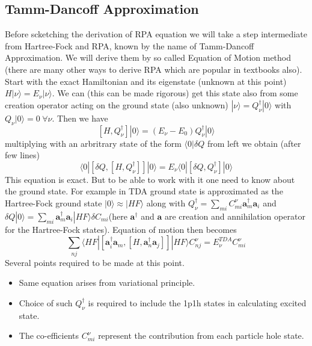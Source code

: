 \documentclass[a4paper]{paper}
\begin{document}
        \subsection{Tamm-Dancoff Approximation}
            Before scketching the derivation of RPA equation we will take a step intermediate from Hartree-Fock and RPA, known by the name of Tamm-Dancoff Approximation. We will derive them by so called Equation of Motion method (there are many other ways to derive RPA which are popular in textbooks also). Start with the exact Hamiltonian and its eigenstate (unknown at this point) $H|\nu\rangle = E_{\nu}|\nu\rangle$. We can (this can be made rigorous) get this state also from some creation operator acting on the ground state (also unknown) $|\nu\rangle = Q^{\dagger}_{\nu} | 0\rangle$ with $Q_{\nu} |0\rangle = 0\hspace{3pt}\forall \nu $. Then we have 
            \begin{equation}
                \left[H, Q^{\dagger}_{\nu}\right] |0\rangle = \left(E_{\nu} - E_{0}\right)Q^{\dagger}_{\nu} |0\rangle
            \end{equation}
            multiplying with an arbritrary state of the form $\langle 0 |\delta Q$ from left we obtain (after few lines)
            \begin{equation}
                \langle 0|\left[\delta Q ,\left[H, Q^{\dagger}_{\nu}\right]\right]|0\rangle = E_{\nu} \langle 0|\left[\delta Q, Q^{\dagger}_{\nu}\right] |0\rangle
            \end{equation}
            This equation is exact. But to be able to work with it one need to know about the ground state. For example in TDA ground state is approximated as the Hartree-Fock ground state $|0\rangle \approx |HF\rangle$ along with $Q^{\dagger}_{\nu} = \sum_{m i} C^{\nu}_{m i} \mathbf{a}^{\dagger}_{m}\mathbf{a}_i$ and $\delta Q |0\rangle= \sum_{m i} \mathbf{a}^{\dagger}_{m}\mathbf{a}_i |HF\rangle \delta C_{m i}$(here $\mathbf{a}^{\dagger}$ and $\mathbf{a}$ are creation and annihilation operator for the Hartree-Fock states). Equation of motion then becomes
            \begin{equation}
                \sum_{n j} \langle HF | \left[\mathbf{a}^{\dagger}_{i} \mathbf{a}_{m} , \left[H,\mathbf{a}^{\dagger}_{n} \mathbf{a}_{j}  \right]\right] | HF \rangle C^{\nu}_{n j} = E^{TDA}_{\nu} C^{\nu}_{m i}
            \end{equation}
            Several points required to be made at this point. 
            \begin{itemize}
                \item Same equation arises from variational principle.
                \item Choice of such $Q^{\dagger}_{\nu}$ is required to include the 1p1h states in calculating excited state. 
                \item The co-efficients $C^{\nu}_{m i} $ represent the contribution from each particle hole state. 
            \end{itemize}
\end{document}
